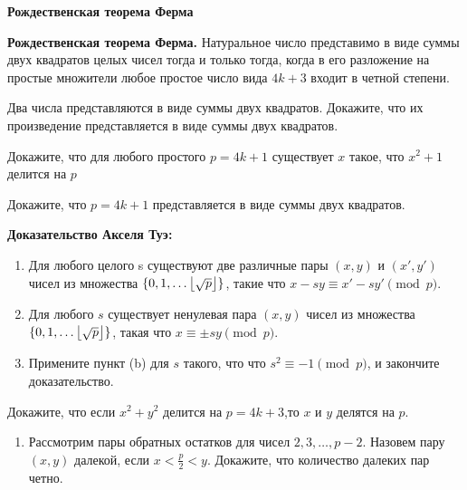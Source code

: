 \documentclass{article}
\begin{document}
    \large

    \begin{center}
        \textbf{Рождественская теорема Ферма}
    \end{center}

    \textbf{Рождественская теорема Ферма.} Натуральное число представимо в виде суммы двух квадратов целых чисел тогда и только тогда, когда в его разложение на простые множители любое простое число вида $4k + 3$ входит в четной степени.

    \begin{enumerate_boxed}
        \item Два числа представляются в виде суммы двух квадратов.
        Докажите, что их произведение представляется в виде суммы двух квадратов.

        \item Докажите, что для любого простого $p = 4k + 1$ существует $x$ такое, что $x^2 + 1$ делится на $p$

        \item Докажите, что $p = 4k + 1$ представляется в виде суммы двух квадратов.

        \textbf{Доказательство Акселя Туэ:}
        \begin{enumerate}
            \item Для любого целого s существуют две различные пары $(x,y)$ и $(x',y')$ чисел из множества $\{0,1,\dotsc \floor*{\sqrt{p}}\}$, такие что $x-sy \equiv x'-sy' \pmod p$.

            \item Для любого $s$ существует ненулевая пара $(x, y)$ чисел из множества $\{0,1,\dotsc \floor*{\sqrt{p}}\}$, такая что $x \equiv \pm sy \pmod p$.

            \item Примените пункт (b) для $s$ такого, что что $s^2 \equiv -1 \pmod p$, и закончите доказательство.
        \end{enumerate}

        \item Докажите, что если $x^2+y^2$ делится на $p=4k+3$,то $x$ и $y$ делятся на $p$.

        \begin{enumerate}
            \item Рассмотрим пары обратных остатков для чисел $2, 3, \dotsc , p - 2$.
            Назовем пару $(x, y)$ далекой, если $x < \frac{p}{2} < y$.
            Докажите, что количество далеких пар четно.


\end{enumerate}
\end{enumerate_boxed}
\end{document}
